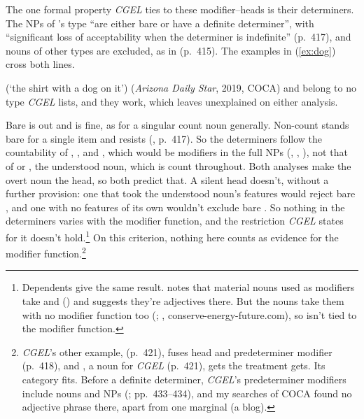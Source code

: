 The one formal property \textit{CGEL} ties to these modifier--heads is their determiners. The NPs of 's type \enquote{are either bare or have a definite determiner}, with \enquote{significant loss of acceptability when the determiner is indefinite} (p.~417), and nouns of other types are excluded, as in  (p.~415). The examples in (\ref{ex:dog}) cross both lines.

\ea\label{ex:dog}
\ea {} (\enquote*{the shirt with a dog on it})
\ex {}
\ex {}
\ex {} (\textit{Arizona Daily Star}, 2019, COCA)
\z\z
{} and  belong to no type \textit{CGEL} lists, and they work, which leaves  unexplained on either analysis.

Bare  is out and  is fine, as for a singular count noun generally. Non-count  stands bare for a single item and resists  (, p.~417). So the determiners follow the countability of , , and , which would be modifiers in the full NPs (, , ), not that of  or , the understood noun, which is count throughout. Both analyses make the overt noun the head, so both predict that. A silent head doesn't, without a further provision: one that took the understood noun's features would reject bare , and one with no features of its own wouldn't exclude bare . So nothing in the determiners varies with the modifier function, and the restriction \textit{CGEL} states for it doesn't hold.\footnote{Dependents give the same result. \textcite[28--29]{matthews2014} notes that material nouns used as modifiers take  and  () and suggests they're adjectives there. But the nouns take them with no modifier function too (; , conserve-energy-future.com), so  isn't tied to the modifier function.} On this criterion, nothing here counts as evidence for the modifier function.\footnote{\textit{CGEL}'s other example,  (p.~421), fuses head and predeterminer modifier (p.~418), and , a noun for \textit{CGEL} (p.~421), gets the treatment  gets. Its category fits. Before a definite determiner, \textit{CGEL}'s predeterminer modifiers include nouns and NPs (; pp.~433--434), and my searches of COCA \citep{davies2008cocaonline} found no adjective phrase there, apart from one marginal  (a blog).}
